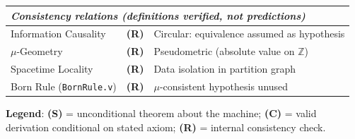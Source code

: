 \documentclass[11pt, a4paper]{report}
\theoremstyle{definition}
\theoremstyle{plain}
\begin{document}
\begin{center}
\begin{tabular}{lll}
\hline
\multicolumn{3}{l}{\emph{Consistency relations (definitions verified, not predictions)}} \\
\hline
Information Causality & \textbf{(R)} & Circular: equivalence assumed as hypothesis \\
$\mu$-Geometry & \textbf{(R)} & Pseudometric (absolute value on $\mathbb{Z}$) \\
Spacetime Locality & \textbf{(R)} & Data isolation in partition graph \\
Born Rule (\texttt{BornRule.v}) & \textbf{(R)} & $\mu$-consistent hypothesis unused \\
\end{tabular}
\end{center}

\medskip
\noindent\textbf{Legend}: \textbf{(S)} = unconditional theorem about the machine; \textbf{(C)} = valid derivation conditional on stated axiom; \textbf{(R)} = internal consistency check.
\end{document}

